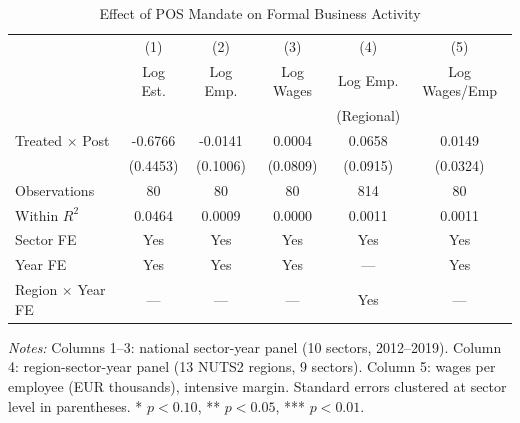 \begin{table}[htbp]
\centering
\caption{Effect of POS Mandate on Formal Business Activity}
\label{tab:main}
\begin{tabular}{lccccc}
\toprule
 & (1) & (2) & (3) & (4) & (5) \\
 & Log Est. & Log Emp. & Log Wages & Log Emp. & Log Wages/Emp \\
 & & & & (Regional) & \\
\midrule
Treated $\times$ Post & -0.6766 & -0.0141 & 0.0004 & 0.0658 & 0.0149 \\
 & (0.4453) & (0.1006) & (0.0809) & (0.0915) & (0.0324) \\
\midrule
Observations & 80 & 80 & 80 & 814 & 80 \\
Within $R^2$ & 0.0464 & 0.0009 & 0.0000 & 0.0011 & 0.0011 \\
Sector FE & Yes & Yes & Yes & Yes & Yes \\
Year FE & Yes & Yes & Yes & --- & Yes \\
Region $\times$ Year FE & --- & --- & --- & Yes & --- \\
\bottomrule
\end{tabular}
\begin{minipage}{\textwidth}
\vspace{0.5em}
\footnotesize
\textit{Notes:} Columns 1--3: national sector-year panel (10 sectors, 2012--2019). Column 4: region-sector-year panel (13 NUTS2 regions, 9 sectors). Column 5: wages per employee (EUR thousands), intensive margin. Standard errors clustered at sector level in parentheses. * $p<0.10$, ** $p<0.05$, *** $p<0.01$.
\end{minipage}
\end{table}
